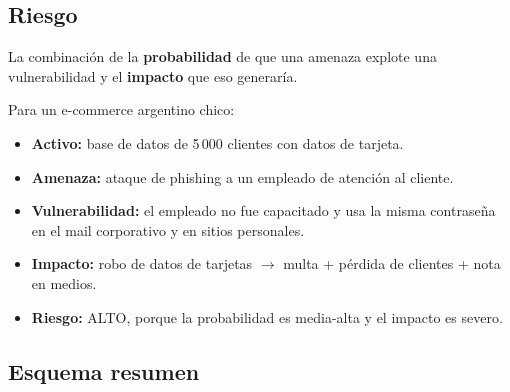 \documentclass[12pt,a4paper]{article}
\begin{document}
\subsection{Riesgo}
\begin{cajaDefinicion}
La combinación de la \textbf{probabilidad} de que una amenaza explote una
vulnerabilidad y el \textbf{impacto} que eso generaría.
\end{cajaDefinicion}

\begin{center}
\end{center}

\begin{cajaEjemplo}[title={Ejemplo integrado}]
Para un e-commerce argentino chico:
\begin{itemize}[leftmargin=2em]
  \item \textbf{Activo:} base de datos de 5\,000 clientes con datos de tarjeta.
  \item \textbf{Amenaza:} ataque de phishing a un empleado de atención al cliente.
  \item \textbf{Vulnerabilidad:} el empleado no fue capacitado y usa la misma
        contraseña en el mail corporativo y en sitios personales.
  \item \textbf{Impacto:} robo de datos de tarjetas $\rightarrow$ multa + pérdida
        de clientes + nota en medios.
  \item \textbf{Riesgo:} ALTO, porque la probabilidad es media-alta y el impacto
        es severo.
\end{itemize}
\end{cajaEjemplo}

\subsection*{Esquema resumen}
\begin{center}
\end{center}
\end{document}
